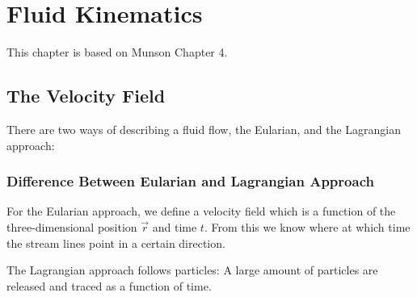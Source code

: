\chapter{Fluid Kinematics}
This chapter is based on Munson Chapter 4.

\section{The Velocity Field}

There are two ways of describing a fluid flow, the Eularian, and the Lagrangian approach:
\subsection{Difference Between Eularian and Lagrangian Approach}
For the Eularian approach, we define a velocity field which is a function of the three-dimensional position $\vec r$ and time $t$. From this we know where at which time the stream lines point in a certain direction.

The Lagrangian approach follows particles: A large amount of particles are released and traced as a function of time. 

